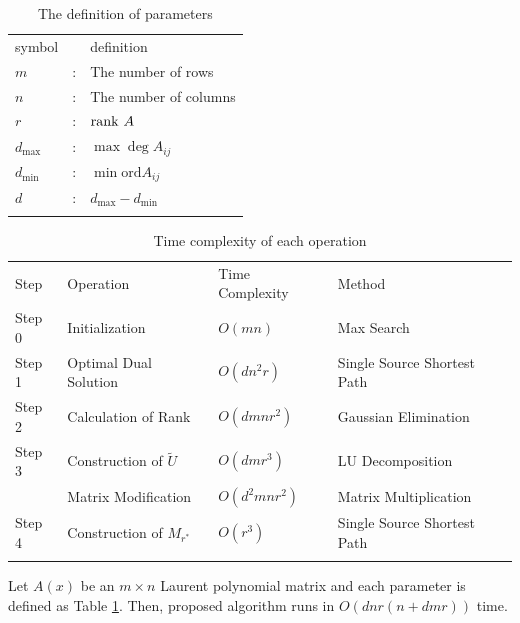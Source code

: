 \begin{table}
\centering
\caption{The definition of parameters}
\label{tabp}  
\begin{tabular}{lll}
\hline\noalign{\smallskip}
symbol &  & definition  \\
\noalign{\smallskip}\hline\noalign{\smallskip}
$m$ & : & The number of rows \\
$n$ & : & The number of columns \\
$r$ & : & $ \mathrm{rank} \  A $ \\
$d_{\max}$ & : & $ \max \deg A_{ij} $ \\
$d_{\min}$ & : & $ \min \mathrm{ord} A_{ij} $\\
$d$ & : & $ d_{\max} - d_{\min} $\\
\noalign{\smallskip}\hline
\end{tabular}
\end{table}

\begin{table}
\centering
\caption{Time complexity of each operation}
\label{tabwtc}  
\begin{tabular}{llll}
\hline\noalign{\smallskip}
Step &  Operation & Time Complexity & Method  \\
\noalign{\smallskip}\hline\noalign{\smallskip}
\hline Step 0 & Initialization & $ O(mn)$ & Max Search \\ 
\hline Step 1 & Optimal Dual Solution & $ O(d n^2 r) $ & Single Source Shortest Path \\ 
\hline Step 2 & Calculation of Rank & $ O(d m n r^2) $ & Gaussian Elimination \\ 
\hline Step 3 & Construction of $\tilde{U}$ & $ O (dmr^3)$ & LU Decomposition \\ 
  & Matrix Modification & $ O (d^2 mnr^2)$ & Matrix Multiplication \\ 
\hline Step 4 & Construction of $M_{r^{\ast}} $ & $ O (r^3) $ & Single Source Shortest Path \\ 
\noalign{\smallskip}\hline
\end{tabular}
\end{table}

\begin{theorem}
Let $ A(x) $ be an $ m \times n $ Laurent polynomial matrix and each parameter is defined as Table \ref{tabp}.
Then, proposed algorithm runs in $ O (dnr(n+dmr)) $ time.
\label{thmwa}
\end{theorem}


